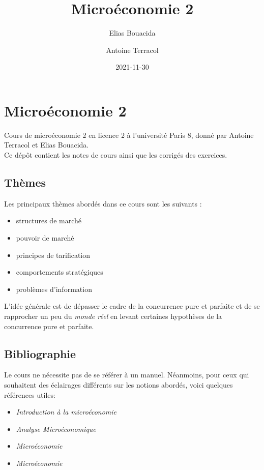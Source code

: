 \documentclass[
]{book}
\title{Microéconomie 2}
\author{Elias Bouacida \and Antoine Terracol}
\date{2021-11-30}
\providecommand{\tightlist}{%
  \setlength{\itemsep}{0pt}\setlength{\parskip}{0pt}}
\theoremstyle{definition}
\theoremstyle{definition}
\theoremstyle{definition}
\theoremstyle{definition}
\theoremstyle{remark}
\begin{document}
\maketitle

{
\setcounter{tocdepth}{1}
\tableofcontents
}
\hypertarget{microuxe9conomie-2}{%
\chapter{Microéconomie 2}\label{microuxe9conomie-2}}

Cours de microéconomie 2 en licence 2 à l'université Paris 8, donné par Antoine Terracol et Elias Bouacida.\\
Ce dépôt contient les notes de cours ainsi que les corrigés des exercices.

\hypertarget{thuxe8mes}{%
\section{Thèmes}\label{thuxe8mes}}

Les principaux thèmes abordés dans ce cours sont les suivants :

\begin{itemize}
\tightlist
\item
  structures de marché
\item
  pouvoir de marché
\item
  principes de tarification
\item
  comportements stratégiques
\item
  problèmes d'information
\end{itemize}

L'idée générale est de dépasser le cadre de la concurrence pure et parfaite et de se rapprocher un peu du \emph{monde réel} en levant certaines hypothèses de la concurrence pure et parfaite.

\hypertarget{bibliographie}{%
\section{Bibliographie}\label{bibliographie}}

Le cours ne nécessite pas de se référer à un manuel.
Néanmoins, pour ceux qui souhaitent des éclairages différents sur les notions abordés, voici quelques références utiles:

\begin{itemize}
\tightlist
\item
  \citet{varian2015} \emph{Introduction à la microéconomie}
\item
  \citet{varian2008} \emph{Analyse Microéconomique}
\item
  \citet{pindyck2012} \emph{Microéconomie}
\item
  \citet{jeleva2014} \emph{Microéconomie}
\end{itemize}
\end{document}
